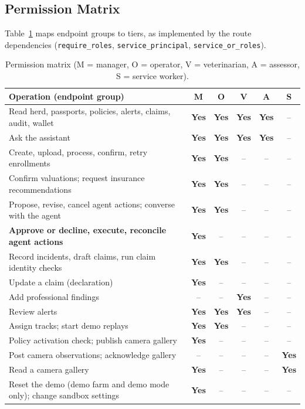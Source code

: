 \documentclass[11pt,letterpaper]{article}
\newcommand{\yes}{\textbf{\textcolor{green!45!black}{Yes}}}
\newcommand{\no}{\textcolor{black!45}{--}}
\begin{document}
\subsection{Permission Matrix}

Table~\ref{tab:matrix} maps endpoint groups to tiers, as implemented by the route dependencies (\texttt{require\_roles}, \texttt{service\_principal}, \texttt{service\_or\_roles}).

\begin{table}[H]
\centering
\caption{Permission matrix (M = manager, O = operator, V = veterinarian, A = assessor, S = service worker).}
\label{tab:matrix}
\footnotesize
\setlength{\tabcolsep}{4pt}
\begin{tabularx}{\textwidth}{>{\raggedright\arraybackslash}Xccccc}
\toprule
Operation (endpoint group) & M & O & V & A & S \\
\midrule
Read herd, passports, policies, alerts, claims, audit, wallet & \yes & \yes & \yes & \yes & \no \\
Ask the assistant & \yes & \yes & \yes & \yes & \no \\
Create, upload, process, confirm, retry enrollments & \yes & \yes & \no & \no & \no \\
Confirm valuations; request insurance recommendations & \yes & \yes & \no & \no & \no \\
Propose, revise, cancel agent actions; converse with the agent & \yes & \yes & \no & \no & \no \\
\textbf{Approve or decline, execute, reconcile agent actions} & \yes & \no & \no & \no & \no \\
Record incidents, draft claims, run claim identity checks & \yes & \yes & \no & \no & \no \\
Update a claim (declaration) & \yes & \no & \no & \no & \no \\
Add professional findings & \no & \no & \yes & \no & \no \\
Review alerts & \yes & \yes & \yes & \no & \no \\
Assign tracks; start demo replays & \yes & \yes & \no & \no & \no \\
Policy activation check; publish camera gallery & \yes & \no & \no & \no & \no \\
Post camera observations; acknowledge gallery & \no & \no & \no & \no & \yes \\
Read a camera gallery & \yes & \no & \no & \no & \yes \\
Reset the demo (demo farm and demo mode only); change sandbox settings & \yes & \no & \no & \no & \no \\
\bottomrule
\end{tabularx}
\end{table}
\end{document}
